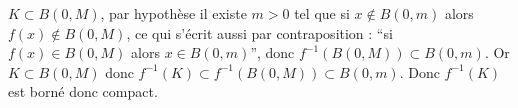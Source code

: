 {\begin{enumerate}
{$K \subset B(0,M)$, par hypothèse il existe $m>0$ tel que si 
$ x\notin B(0,m)$ alors $f(x) \notin B(0,M)$, ce qui s'écrit aussi 
par contraposition : ``si $f(x) \in B(0,M)$ alors $x\in B(0,m)$'', donc
$f^{-1}(B(0,M)) \subset B(0,m)$. Or $K \subset B(0,M)$ donc
$f^{-1}(K) \subset f^{-1}(B(0,M)) \subset B(0,m)$. Donc
$f^{-1}(K)$ est borné donc compact.
}
\end{enumerate}
}
